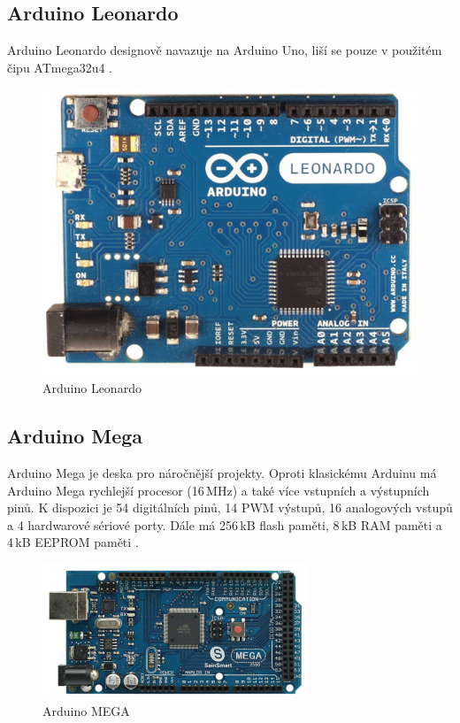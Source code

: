 		\subsection{Arduino Leonardo} 
		Arduino Leonardo designově navazuje na Arduino Uno, liší se pouze v použitém čipu ATmega32u4 \cite{ArduinoLeonardo}.
				\begin{figure}[!h]
  \begin{center}
    \includegraphics[scale=0.2]{obrazky/emded_arduino_leonardo}
  \end{center}
  \caption{Arduino Leonardo \cite{ArduinoLeonardo}}
\end{figure}
		
					\subsection{Arduino Mega} 
					Arduino Mega je deska pro náročnější projekty. Oproti klasickému Arduinu má Arduino Mega rychlejší procesor (16\,MHz) a také více vstupních a výstupních pinů. K dispozici je 54 digitálních pinů, 14 PWM výstupů, 16 analogových vstupů a 4 hardwarové sériové porty. Dále má 256\,kB flash paměti, 8\,kB RAM paměti a 4\,kB EEPROM paměti \cite{ArduinoMega}.	
			
			\begin{figure}[!h]
  \begin{center}
    \includegraphics[scale=0.9]{obrazky/emded_arduino_mega}
  \end{center}
  \caption{Arduino MEGA \cite{ArduinoMega}}
\end{figure}


